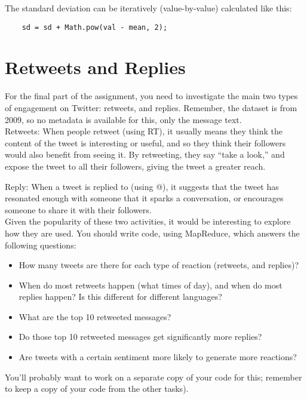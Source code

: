 \documentclass[a4paper,10pt]{article}
\begin{document}
  The standard deviation can be iteratively (value-by-value) calculated like this: 
  \begin{lstlisting}
    sd = sd + Math.pow(val - mean, 2);
  \end{lstlisting}
  
  \section{Retweets and Replies}

  For the final part of the assignment, you need to investigate the main two types of
  engagement on Twitter: retweets, and replies. Remember, the dataset is from 2009,
  so no metadata is available for this, only the message text. \\

  Retweets: When people retweet (using RT), it usually means they think the content of the tweet is interesting or useful,
  and so they think their followers would also benefit from seeing it. By retweeting, they say ``take a look,''  and expose
  the tweet to all their followers, giving the tweet a greater reach.
  
  Reply: When a tweet is replied to (using @), it suggests that the tweet has
  resonated enough with someone that it sparks a conversation, or encourages
  someone to share it with their followers. \\

  Given the popularity of these two activities, it would be interesting to explore how they are used. You should write code, using MapReduce,
  which answers the following questions:

  \begin{itemize}
  \item How many tweets are there for each type of reaction (retweets, and replies)?
  \item When do most retweets happen (what times of day), and when do most replies happen? Is this different for different languages?
  \item What are the top 10 retweeted messages?
  \item Do those top 10 retweeted messages get significantly more replies?
  \item Are tweets with a certain sentiment more likely to generate more reactions?
  \end{itemize}

  You'll probably want to work on a separate copy of your code for this; remember to keep a copy of your code from the other tasks).
\end{document}
